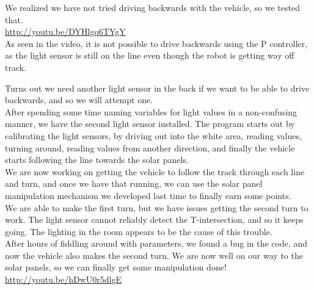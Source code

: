 We realized we have not tried driving backwards with the vehicle, so we
tested that.\\\url{http://youtu.be/DYHlgq6TYgY}\\As seen in the video,
it is not possible to drive backwards using the P controller, as the
light sensor is still on the line even though the robot is getting way
off track.

Turns out we need another light sensor in the back if we want to be able
to drive backwards, and so we will attempt one.\\After spending some time
naming variables for light values in a non-confusing manner, we have the second light sensor
installed. The program starts out by calibrating the light sensors, by
driving out into the white area, reading values, turning around, reading
values from another direction, and finally the vehicle starts following
the line towards the solar panels.\\We are now working on getting the
vehicle to follow the track through each line and turn, and once we have
that running, we can use the solar panel manipulation mechanism we
developed last time to finally earn some points.\\We are able to make the
first turn, but we have issues getting the second turn to work. The
light sensor cannot reliably detect the T-intersection, and so it keeps going.
The lighting in the room appears to be the cause of this trouble.\\After
hours of fiddling around with parameters, we found a bug in the code,
and now the vehicle also makes the second turn. We are now well on our
way to the solar panels, so we can finally get some manipulation done!
\url{http://youtu.be/hDwU0r5dlgE}


